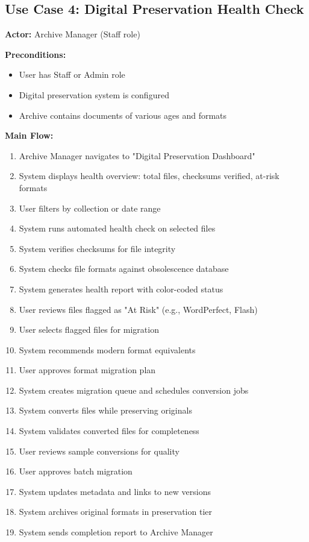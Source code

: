 \documentclass[12pt,a4paper]{report}
\begin{document}
\subsection{Use Case 4: Digital Preservation Health Check}

\textbf{Actor:} Archive Manager (Staff role)

\textbf{Preconditions:}
\begin{itemize}
    \item User has Staff or Admin role
    \item Digital preservation system is configured
    \item Archive contains documents of various ages and formats
\end{itemize}

\textbf{Main Flow:}
\begin{enumerate}
    \item Archive Manager navigates to "Digital Preservation Dashboard"
    \item System displays health overview: total files, checksums verified, at-risk formats
    \item User filters by collection or date range
    \item System runs automated health check on selected files
    \item System verifies checksums for file integrity
    \item System checks file formats against obsolescence database
    \item System generates health report with color-coded status
    \item User reviews files flagged as "At Risk" (e.g., WordPerfect, Flash)
    \item User selects flagged files for migration
    \item System recommends modern format equivalents
    \item User approves format migration plan
    \item System creates migration queue and schedules conversion jobs
    \item System converts files while preserving originals
    \item System validates converted files for completeness
    \item User reviews sample conversions for quality
    \item User approves batch migration
    \item System updates metadata and links to new versions
    \item System archives original formats in preservation tier
    \item System sends completion report to Archive Manager
\end{enumerate}
\end{document}
